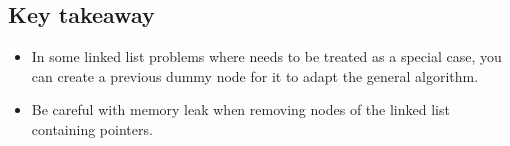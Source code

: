 \documentclass[letterpaper,12pt,english]{book}
\begin{document}
\begin{sphinxVerbatim}[commandchars=\\\{\}]
\end{sphinxVerbatim}


\subsection{Key takeaway}
\label{\detokenize{Linked_List/02_LL_203_Remove_Linked_List_Elements:key-takeaway}}\begin{itemize}
\item {} 
\sphinxAtStartPar
In some linked list problems where  needs to be treated as a special case, you can create a previous dummy node for it to adapt the general algorithm.

\item {} 
\sphinxAtStartPar
Be careful with memory leak when removing nodes of the linked list containing pointers.

\end{itemize}
\end{document}
